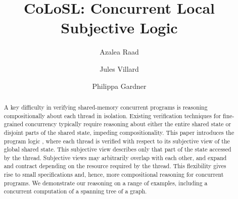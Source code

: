 \documentclass[runningheads,a4paper]{llncs}
\begin{document}
%
\title{CoLoSL: Concurrent Local Subjective Logic}
\author{Azalea Raad\and Jules Villard\and Philippa Gardner}

\maketitle

\begin{abstract}
A key difficulty in verifying shared-memory concurrent programs is
reasoning compositionally about each thread in isolation. Existing
verification techniques for fine-grained concurrency typically require
reasoning about either the entire shared state  or disjoint
parts of the shared state,  impeding compositionality.  This paper introduces
the program logic \colosl, where each thread is verified with respect
to its subjective view of the global shared state.  This subjective
view describes only that part of the state  accessed
by the thread. Subjective views may arbitrarily overlap with each
other, and expand and contract depending on the resource required by
the thread.  This flexibility gives rise to small specifications and,
hence,  more compositional reasoning for concurrent programs. We
demonstrate our reasoning on 
a range of examples,  including a concurrent
computation of a spanning tree of a graph.
\end{abstract}

\allowdisplaybreaks







%
\end{document}

